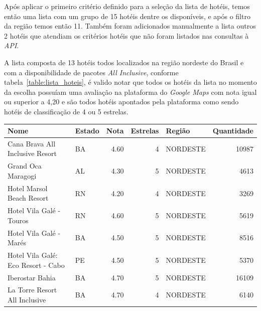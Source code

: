 Após aplicar o primeiro critério definido para a seleção da lista de hotéis, temos então uma lista com um grupo de 15 hotéis dentre os disponíveis, e após o filtro da região temos então 11. Também foram adicionados manualmente a lista outros 2 hotéis que atendiam os critérios hotéis que não foram listados nas consultas à \textit{API}.

A lista composta de 13 hotéis todos localizados na região nordeste do Brasil e com a disponibilidade de pacotes \textit{All Inclusive}, conforme tabela~\ref{table:lista_hoteis}, é valido notar que todos os hotéis da lista no momento da escolha possuíam uma avaliação na plataforma do \textit{Google Maps} com nota igual ou superior a 4,20 e são todos hotéis apontados pela plataforma como sendo hotéis de classificação de 4 ou 5 estrelas.

\begin{table}[]
	\begin{tabular}{|p{5cm}|l|r|r|l|r|}
		\hline
		\textbf{Nome}                                 & \textbf{Estado} & \textbf{Nota} & \textbf{Estrelas} & \textbf{Região} & \textbf{Quantidade} \\\hline
		Cana Brava All Inclusive Resort               & BA              & 4.60          & 4                 & NORDESTE        & 10987               \\\hline
		Grand Oca Maragogi                            & AL              & 4.30          & 5                 & NORDESTE        & 4613                \\\hline
		Hotel Marsol Beach Resort                     & RN              & 4.20          & 4                 & NORDESTE        & 3269                \\\hline
		Hotel Vila Galé - Touros                      & RN              & 4.60          & 5                 & NORDESTE        & 5619                \\\hline
		Hotel Vila Galé - Marés                       & BA              & 4.50          & 5                 & NORDESTE        & 8516                \\\hline
		Hotel Vila Galé: Eco Resort - Cabo            & PE              & 4.50          & 5                 & NORDESTE        & 5370                \\\hline
		Iberostar Bahia                               & BA              & 4.70          & 5                 & NORDESTE        & 16109               \\\hline
		La Torre Resort All Inclusive                 & BA              & 4.70          & 4                 & NORDESTE        & 6140                \\\hline

\end{tabular}
\end{table}
